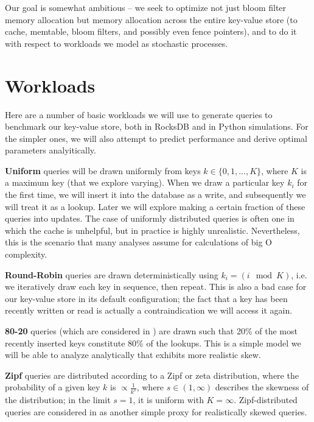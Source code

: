 \documentclass{sig-alternate-05-2015}
\begin{document}
Our goal is somewhat ambitious -- we seek to optimize not just bloom filter
memory allocation but memory allocation across the entire key-value store (to
cache, memtable, bloom filters, and possibly even fence pointers), and to do it
with respect to workloads we model as stochastic processes.

\section{Workloads}

Here are a number of basic workloads we will use to generate queries to
benchmark our key-value store, both in RocksDB and in Python simulations. For
the simpler ones, we will also attempt to predict performance and derive
optimal parameters analyitically.

\textbf{Uniform} queries will be drawn uniformly from keys $k \in
\{0,1,...,K\}$, where $K$ is a maximum key (that we explore varying). When we
draw a particular key $k_i$ for the first time, we will insert it into the
database as a write, and subsequently we will treat it as a lookup. Later we
will explore making a certain fraction of these queries into updates. The case
of uniformly distributed queries is often one in which the cache is unhelpful,
but in practice is highly unrealistic. Nevertheless, this is the scenario that
many analyses assume for calculations of big O complexity.

\textbf{Round-Robin} queries are drawn deterministically using $k_i = (i \mod
K)$, i.e. we iteratively draw each key in sequence, then repeat. This is also a
bad case for our key-value store in its default configuration; the fact that a
key has been recently written or read is actually a contraindication we will
access it again.

\textbf{80-20} queries (which are considered in \cite{monkey}) are drawn such
that 20\% of the most recently inserted keys constitute 80\% of the lookups.
This is a simple model we will be able to analyze analytically that exhibits
more realistic skew.

\textbf{Zipf} queries are distributed according to a Zipf or zeta distribution,
where the probability of a given key $k$ is $\propto \frac{1}{k^s}$, where $s
\in (1, \infty)$ describes the skewness of the distribution; in the limit
$s=1$, it is uniform with $K=\infty$. Zipf-distributed queries are considered
in \cite{art} as another simple proxy for realistically skewed queries.
\end{document}
